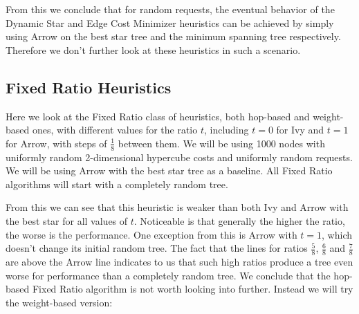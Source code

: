 \documentclass[a4paper, oneside]{discothesis}
\begin{document}
From this we conclude that for random requests, the eventual behavior of the Dynamic Star and Edge Cost Minimizer heuristics can be achieved by simply using Arrow on the best star tree and the minimum spanning tree respectively. Therefore we don't further look at these heuristics in such a scenario.

\subsection{Fixed Ratio Heuristics}

Here we look at the Fixed Ratio class of heuristics, both hop-based and weight-based ones, with different values for the ratio $t$, including $t=0$ for Ivy and $t=1$ for Arrow, with steps of $\frac{1}{8}$ between them. We will be using 1000 nodes with uniformly random 2-dimensional hypercube costs and uniformly random requests. We will be using Arrow with the best star tree as a baseline. All Fixed Ratio algorithms will start with a completely random tree.


From this we can see that this heuristic is weaker than both Ivy and Arrow with the best star for all values of $t$. Noticeable is that generally the higher the ratio, the worse is the performance. One exception from this is Arrow with $t=1$, which doesn't change its initial random tree. The fact that the lines for ratios $\frac{5}{8}$, $\frac{6}{8}$ and $\frac{7}{8}$ are above the Arrow line indicates to us that such high ratios produce a tree even worse for performance than a completely random tree. We conclude that the hop-based Fixed Ratio algorithm is not worth looking into further. Instead we will try the weight-based version:
\end{document}
